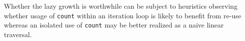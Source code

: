 \documentclass[
]{ceurart}
\begin{document}
Whether the lazy growth is worthwhile can be subject to heuristics observing whether usage of \verb!count! within an iteration loop is likely to benefit from re-use whereas an isolated use of \verb!count! may be better realized as a naive linear traversal.





\end{document}
